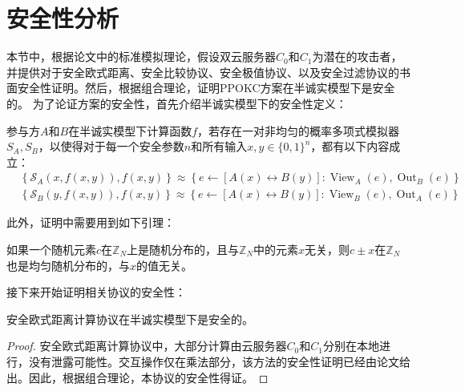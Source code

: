 \section{安全性分析}
\label{s3-lilun}
本节中，根据论文\cite{goldreich2004encryption}中的标准模拟理论，假设双云服务器$ C_0$和$ C_1$为潜在的攻击者，并提供对于安全欧式距离、安全比较协议、安全极值协议、以及安全过滤协议的书面安全性证明。然后，根据组合理论，证明PPOKC方案在半诚实模型下是安全的。 为了论证方案的安全性，首先介绍半诚实模型下的安全性定义\cite{bogdanov2008sharemind}：
\begin{definition}
	参与方$ A $和$ B $在半诚实模型下计算函数$ f $，若存在一对非均匀的概率多项式模拟器$ S_A,S_B $，以使得对于每一个安全参数$ n $和所有输入$ x,y\in\{0,1\}^n $，都有以下内容成立：
	\begin{equation}
		\begin{aligned}
			 & \left\{\mathcal{S}_A(x, f(x, y)), f(x, y)\right\} \approx\left\{e \leftarrow[A(x) \leftrightarrow B(y)]: \operatorname{View}_A(e), \operatorname{Out}_B(e)\right\} \\
			 & \left\{\mathcal{S}_B(y, f(x, y)), f(x, y)\right\} \approx\left\{e \leftarrow[A(x) \leftrightarrow B(y)]: \operatorname{View}_B(e), \operatorname{Out}_A(e)\right\}
		\end{aligned}
	\end{equation}
\end{definition}

此外，证明中需要用到如下引理：

\begin{lemma}
	\label{s3-lemma1}
	如果一个随机元素$ c $在$ \mathbb{Z}_N $上是随机分布的，且与$ \mathbb{Z}_N $中的元素$ x $无关，则$ c\pm x$在$ \mathbb{Z}_N $也是均匀随机分布的，与$ x $的值无关。
\end{lemma}

接下来开始证明相关协议的安全性：

\begin{theorem}
	安全欧式距离计算协议在半诚实模型下是安全的。
\end{theorem}
\begin{proof}
	安全欧式距离计算协议中，大部分计算由云服务器$ C_0 $和$ C_1 $分别在本地进行，没有泄露可能性。交互操作仅在乘法部分，该方法的安全性证明已经由论文\cite{beaver1992efficient}给出。因此，根据组合理论，本协议的安全性得证。
\end{proof}

